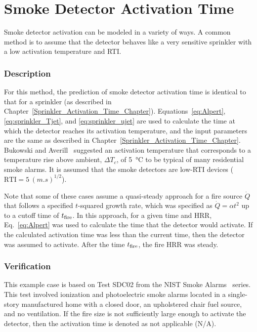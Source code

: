
\chapter{Smoke Detector Activation Time}
\label{Smoke_Detector_Activation_Time_Chapter}

Smoke detector activation can be modeled in a variety of ways. A common method is to assume that the detector behaves like a very sensitive sprinkler with a low activation temperature and RTI.

\subsection*{Description}

For this method, the prediction of smoke detector activation time is identical to that for a sprinkler (as described in Chapter~\ref{Sprinkler_Activation_Time_Chapter}). Equations~\ref{eq:Alpert}, \ref{eq:sprinkler_Tjet}, and \ref{eq:sprinkler_ujet} are used to calculate the time at which the detector reaches its activation temperature, and the input parameters are the same as described in Chapter~\ref{Sprinkler_Activation_Time_Chapter}. Bukowski and Averill~\cite{Bukowski:2} suggested an activation temperature that corresponds to a temperature rise above ambient, $\Delta T_c$, of \SI{5}{\celsius} to be typical of many residential smoke alarms. It is assumed that the smoke detectors are low-RTI devices ($\textrm{RTI}=5~\si{(m.s)^{1/2}}$).

Note that some of these cases assume a quasi-steady approach for a fire source $\dot Q$ that follows a specified $t$-squared growth rate, which was specified as $\dot Q = \alpha t^2$ up to a cutoff time of $t_{\rm fire}$. In this approach, for a given time and HRR, Eq.~\ref{eq:Alpert} was used to calculate the time that the detector would activate. If the calculated activation time was less than the current time, then the detector was assumed to activate. After the time $t_{\rm fire}$, the fire HRR was steady.


\clearpage


\subsection*{Verification}

This example case is based on Test SDC02 from the NIST Smoke Alarms~\cite{Bukowski:1} series. This test involved ionization and photoelectric smoke alarms located in a single-story manufactured home with a closed door, an upholstered chair fuel source, and no ventilation. If the fire size is not sufficiently large enough to activate the detector, then the activation time is denoted as not applicable (N/A).

